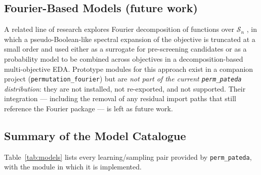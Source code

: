 \documentclass[a4paper,11pt]{article}
\begin{document}
\subsection{Fourier-Based Models (future work)}

A related line of research explores Fourier decomposition of functions over
$\mathcal{S}_n$ \citep{Chicano_et_al:2023,Kondor_et_al:2007}, in which a
pseudo-Boolean-like spectral expansion of the objective is truncated at a small
order and used either as a surrogate for pre-screening candidates or as a
probability model to be combined across objectives in a decomposition-based
multi-objective EDA.  Prototype modules for this approach exist in a companion
project (\texttt{permutation\_fourier}) but are \emph{not part of the current
\texttt{perm\_pateda} distribution}: they are not installed, not re-exported,
and not supported.  Their integration --- including the removal of any residual
import paths that still reference the Fourier package --- is left as future work.

\subsection{Summary of the Model Catalogue}

Table~\ref{tab:models} lists every learning/sampling pair provided by
\texttt{perm\_pateda}, with the module in which it is implemented.
\end{document}
